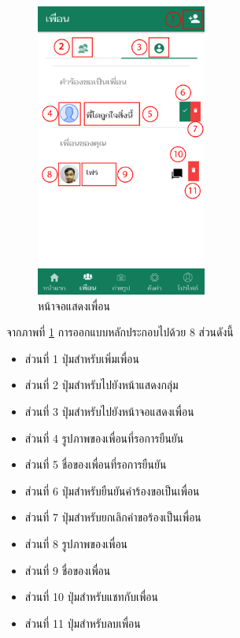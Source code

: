 		\begin{figure}[H]
			\centering
			\includegraphics[width=0.5\textwidth]{Figures/3/UI/friend}
			\caption{หน้าจอแสดงเพื่อน}
			\label{Fig:เพื่อน}
		\end{figure}
		จากภาพที่ \ref{Fig:เพื่อน} การออกแบบหลักประกอบไปด้วย 8 ส่วนดังนี้
		\begin{itemize}
			\item ส่วนที่ 1 ปุ่มสำหรับเพิ่มเพื่อน
			\item ส่วนที่ 2 ปุ่มสำหรับไปยังหน้าแสดงกลุ่ม
			\item ส่วนที่ 3 ปุ่มสำหรับไปยังหน้าจอแสดงเพื่อน
			\item ส่วนที่ 4 รูปภาพของเพื่อนที่รอการยืนยัน
			\item ส่วนที่ 5 ชื่อของเพื่อนที่รอการยืนยัน
			\item ส่วนที่ 6 ปุ่มสำหรับยืนยันคำร้องขอเป็นเพื่อน
			\item ส่วนที่ 7 ปุ่มสำหรับยกเลิกคำขอร้องเป็นเพื่อน
			\item ส่วนที่ 8 รูปภาพของเพื่อน
			\item ส่วนที่ 9 ชื่อของเพื่อน
			\item ส่วนที่ 10 ปุ่มสำหรับแชทกับเพื่อน
			\item ส่วนที่ 11 ปุ่มสำหรับลบเพื่อน
		\end{itemize} \\

